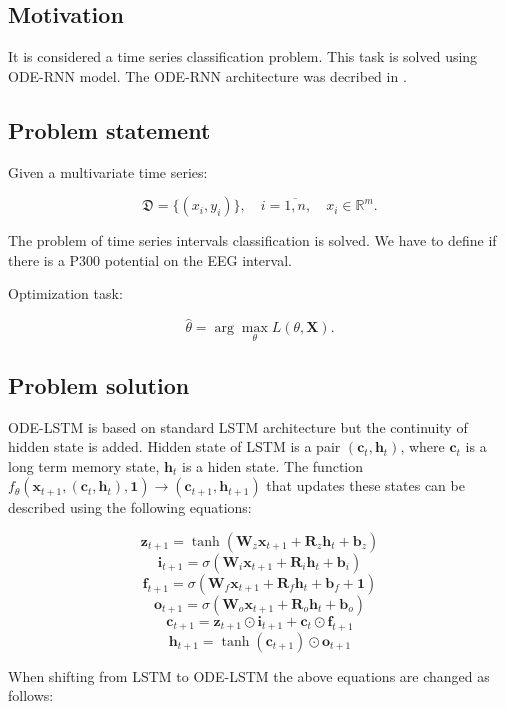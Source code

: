 \documentclass[../../main.tex]{subfiles}
\begin{document}
\subsection{Motivation}

It is considered a time series classification problem. This task is solved using ODE-RNN model. The ODE-RNN architecture was decribed in \cite{Samokhina}.

\subsection{Problem statement}

Given a multivariate time series:

$$\mathfrak{D} = \{(x_i, y_i)\}, \quad i = \overline{1, n}, \quad x_i \in \mathbb{R}^m.$$

\noindent
The problem of time series intervals classification is solved. We have to define if there is a P300 potential on the EEG interval.

Optimization task:

$$\hat{\theta} = \arg\max\limits_{\theta}L(\theta, \mathbf{X}).$$

\subsection{Problem solution}

ODE-LSTM is based on standard LSTM architecture but the continuity of hidden state is added. Hidden state of LSTM is a pair $(\mathbf{c}_t, \mathbf{h}_t)$, where $\mathbf{c}_t$ is a long term memory state, $\mathbf{h}_t$ is a hiden state. The function $f_\theta(\mathbf{x}_{t+1}, (\mathbf{c}_t, \mathbf{h}_t), \mathbf{1}) \rightarrow (\mathbf{c}_{t+1}, \mathbf{h}_{t+1})$ that updates these states can be described using the following equations:

$$\mathbf{z}_{t+1} = \tanh(\mathbf{W}_z\mathbf{x}_{t+1} + \mathbf{R}_z\mathbf{h}_t + \mathbf{b}_z)$$
$$\mathbf{i}_{t+1} = \sigma(\mathbf{W}_i\mathbf{x}_{t+1} + \mathbf{R}_i\mathbf{h}_t + \mathbf{b}_i)$$
$$\mathbf{f}_{t+1} = \sigma(\mathbf{W}_f\mathbf{x}_{t+1} + \mathbf{R}_f\mathbf{h}_t + \mathbf{b}_f + \mathbf{1})$$
$$\mathbf{o}_{t+1} = \sigma(\mathbf{W}_o\mathbf{x}_{t+1} + \mathbf{R}_o\mathbf{h}_t + \mathbf{b}_o)$$
$$\mathbf{c}_{t+1} = \mathbf{z}_{t+1} \odot \mathbf{i}_{t+1} + \mathbf{c}_{t} \odot \mathbf{f}_{t+1}$$
$$\mathbf{h}_{t+1} = \tanh(\mathbf{c}_{t+1}) \odot \mathbf{o}_{t+1}$$

When shifting from LSTM to ODE-LSTM the above equations are changed as follows:
\end{document}
